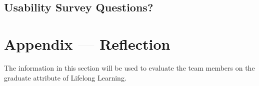 \documentclass[12pt, titlepage]{article}
\begin{document}
\subsection{Usability Survey Questions?}


\newpage{}

\section*{Appendix --- Reflection}

The information in this section will be used to evaluate the team members on the
graduate attribute of Lifelong Learning.

% 
\end{document}
